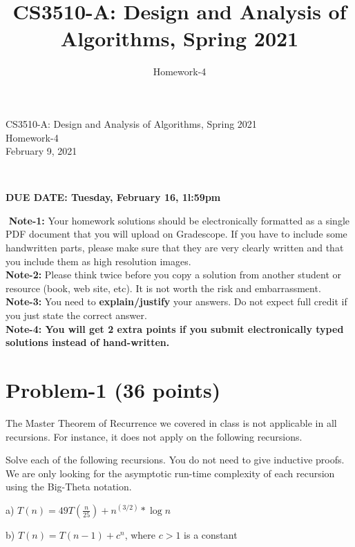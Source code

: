 \documentclass[11pt]{article}
\title{CS3510-A: Design and Analysis of Algorithms, Spring 2021}
\author{Homework-4}
\begin{document}
\begin{center}
    
    \LARGE CS3510-A: Design and Analysis of Algorithms, Spring 2021 \\ \vspace{1em} 
    \large Homework-4 \\ \vspace{0.5em}
    February 9, 2021
\end{center}
\thispagestyle{empty}
\pagestyle{empty}
​
\noindent
\begin{center}
{\bf DUE DATE: Tuesday, February 16, 1l:59pm}
\end{center}
​
\noindent
{\bf Note-1:} Your homework solutions should be electronically formatted as a single PDF document that you will upload on Gradescope. 
If you have to include some handwritten parts, please make sure that they are very clearly written and that you include them as high resolution images. \\
​
\noindent
{\bf Note-2:} Please think twice before you copy a solution from another student or resource (book, web site, etc). 
It is not worth the risk and embarrassment. \\
​
\noindent
{\bf Note-3:} You need to {\bf explain/justify} your answers. Do not expect full credit if you just state the correct answer. \\
​
\noindent
{\bf Note-4: You will get 2 extra points if you submit electronically typed solutions instead of hand-written.} 
​
\newpage
\section*{Problem-1 (36 points)}
The Master Theorem of Recurrence we covered in class is not applicable in all recursions. For instance, it does not apply on the following recursions.

Solve each of the following recursions. You do not need to give inductive proofs. We are only looking for the asymptotic run-time complexity of each recursion using the Big-Theta notation. 
\vspace{5pt}

a) $T(n) = 49T(\frac{n}{25}) + n^{(3/2)} * \log{n}$ 
\vspace{5pt}

b) $T(n) = T(n-1) + c^n$, where $c > 1$ is a constant
\vspace{5pt}
\end{document}
